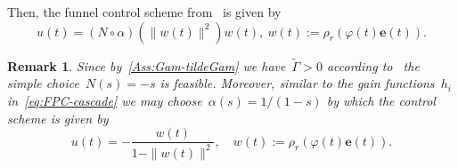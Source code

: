 \documentclass[ envcountsect, envcountsame]{svjour3}
\newtheorem{Remark}[Theorem]{Remark}
\newcommand{\vp}{\varphi}
\begin{document}
%
Then, the funnel control scheme from~\cite[Sec. 1.4, Eqt. (9)]{BergIlch21} is given by
\begin{equation} \label{eq:FC}
u(t) = (N \circ \alpha)(\|w(t)\|^2) w(t), \ w(t) := \rho_r(\vp(t) \textbf{e}(t)).
\end{equation}
%
\begin{Remark}
Since by~\ref{Ass:Gam-tildeGam} we have~$\tilde \Gamma > 0$ according to~\cite[Rem.~1.8.(b)]{BergIlch21} the simple choice~$N(s) = -s$ is feasible.
Moreover, similar to the gain functions~$h_i$ in~\eqref{eq:FPC-cascade} we may choose~$\alpha(s) = 1/(1-s)$ by which the control scheme is given by
\begin{equation} \label{eq:FC-simple}
u(t) = - \frac{w(t)}{1 - \|w(t)\|^2}, \quad w(t) := \rho_r(\vp(t) \textbf{e}(t)).
\end{equation}
\end{Remark}
%
\end{document}
